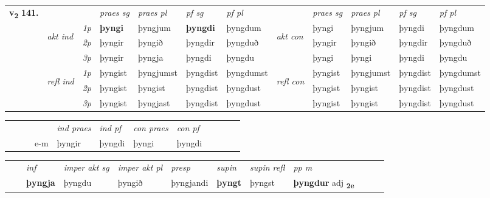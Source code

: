 \begin{tabular}{llllllllllll} \toprule
\multirow{4}{*}{{{\textbf{v{\textsubscript{2}}} \Large{\textbf{141.}}}}}  & &   &  \textit{praes sg}  & \textit{praes pl}  &\textit{ pf sg} & \textit{pf pl} &  &  \textit{praes sg}  & \textit{praes pl}  & \textit{pf sg} & \textit{pf pl } \\*
	\cmidrule{4-7} \cmidrule{9-12}
 & \multirow{3}{*}{\begin{turn}{90}\textit{akt ind}\end{turn}} & {\textit{1p}} & \textbf{þyngi} & þyngjum    & \textbf{þyngdi} & þyngdum & \multirow{3}{*}{\begin{turn}{90}\textit{akt con}\end{turn}} &þyngi & þyngjum & þyngdi & þyngdum\\*
& &  {\textit{2p}} &  þyngir  & þyngið   & þyngdir & þyngduð & & þyngir & þyngið & þyngdir & þyngduð \\*
& &  {\textit{3p}} & þyngir & þyngja   & þyngdi & þyngdu & & þyngi & þyngi& þyngdi & þyngdu  \\*
\cmidrule{4-7} \cmidrule{9-12}
 &\multirow{3}{*}{\begin{turn}{90}\textit{refl ind}\end{turn}} & {\textit{1p}} & þyngist & þyngjumst    & þyngdist & þyngdumst & \multirow{3}{*}{\begin{turn}{90}\textit{refl con}\end{turn}}  &þyngist & þyngjumst & þyngdist & þyngdumst\\*
 &&  {\textit{2p}} &  þyngist  & þyngist   & þyngdist & þyngdust & &þyngist & þyngist & þyngdist & þyngdust \\*
& &  {\textit{3p}} & þyngist & þyngjast   & þyngdist & þyngdust & & þyngist & þyngist& þyngdist & þyngdust  \\*
\cmidrule{4-7} \cmidrule{9-12}
\end{tabular}


\begin{tabular}{llllllllllll}
 & &  & &  \textit{ind praes} & \textit{ind pf} & \textit{con praes} & \textit{con pf} \\*
&  & & e-m & þyngir & þyngdi & þyngi & þyngdi \\*
\cmidrule{5-9}
\end{tabular}


\begin{tabular}{llllllllllll}
 & & \textit{inf} & \textit{imper akt sg} & \textit{imper akt pl}   & \textit{presp} & \textit{supin} & \textit{supin refl} & \textit{pp m}     \\*
  & & \textbf{þyngja} & þyngdu  & þyngið   & þyngjandi &  \textbf{þyngt} & þyngst & \textbf{þyngdur} adj \textbf{\textsubscript{2e}} \\*
\cmidrule{1-12}
\end{tabular}



